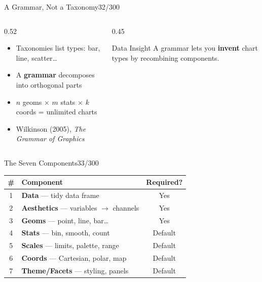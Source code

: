 \documentclass[10pt]{beamer}
\newcommand{\smark}[1]{\hfill{\scriptsize\color{codegray}#1}}
\begin{document}
\begin{frame}{A Grammar, Not a Taxonomy}\smark{32/300}
\begin{columns}[T]
\begin{column}{0.52\textwidth}
\begin{itemize}
    \item Taxonomies list types: bar, line, scatter\ldots
    \item A \textbf{grammar} decomposes into orthogonal parts
    \item $n$ geoms $\times$ $m$ stats $\times$ $k$ coords = unlimited charts
    \item Wilkinson (2005), \textit{The Grammar of Graphics}
\end{itemize}
\end{column}
\begin{column}{0.45\textwidth}
\begin{exampleblock}{Data Insight}
    \scriptsize A grammar lets you \textbf{invent} chart types by recombining components.
\end{exampleblock}
\end{column}
\end{columns}
\end{frame}

\begin{frame}{The Seven Components}\smark{33/300}
\centering\small
\begin{tabular}{@{}clc@{}}
    \toprule
    \# & \textbf{Component} & \textbf{Required?} \\
    \midrule
    1 & \textbf{Data} --- tidy data frame             & Yes \\
    2 & \textbf{Aesthetics} --- variables $\to$ channels & Yes \\
    3 & \textbf{Geoms} --- point, line, bar\ldots      & Yes \\
    4 & \textbf{Stats} --- bin, smooth, count           & Default \\
    5 & \textbf{Scales} --- limits, palette, range      & Default \\
    6 & \textbf{Coords} --- Cartesian, polar, map       & Default \\
    7 & \textbf{Theme/Facets} --- styling, panels       & Default \\
    \bottomrule
\end{tabular}
\end{frame}
\end{document}
